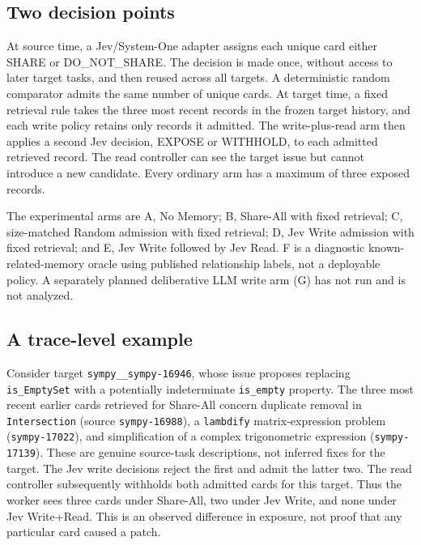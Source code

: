 \documentclass[sigconf,anonymous]{aamas}
\begin{document}
\subsection{Two decision points}
At source time, a Jev/System-One adapter assigns each unique card either SHARE or DO\_NOT\_SHARE. The decision is made once, without access to later target tasks, and then reused across all targets. A deterministic random comparator admits the same number of unique cards. At target time, a fixed retrieval rule takes the three most recent records in the frozen target history, and each write policy retains only records it admitted. The write-plus-read arm then applies a second Jev decision, EXPOSE or WITHHOLD, to each admitted retrieved record. The read controller can see the target issue but cannot introduce a new candidate. Every ordinary arm has a maximum of three exposed records.

The experimental arms are A, No Memory; B, Share-All with fixed retrieval; C, size-matched Random admission with fixed retrieval; D, Jev Write admission with fixed retrieval; and E, Jev Write followed by Jev Read. F is a diagnostic known-related-memory oracle using published relationship labels, not a deployable policy. A separately planned deliberative LLM write arm (G) has not run and is not analyzed.

\subsection{A trace-level example}
Consider target \texttt{sympy\_\_sympy-16946}, whose issue proposes replacing \texttt{is\_EmptySet} with a potentially indeterminate \texttt{is\_empty} property. The three most recent earlier cards retrieved for Share-All concern duplicate removal in \texttt{Intersection} (source \texttt{sympy-16988}), a \texttt{lambdify} matrix-expression problem (\texttt{sympy-17022}), and simplification of a complex trigonometric expression (\texttt{sympy-17139}). These are genuine source-task descriptions, not inferred fixes for the target. The Jev write decisions reject the first and admit the latter two. The read controller subsequently withholds both admitted cards for this target. Thus the worker sees three cards under Share-All, two under Jev Write, and none under Jev Write+Read. This is an observed difference in exposure, not proof that any particular card caused a patch.
\end{document}
